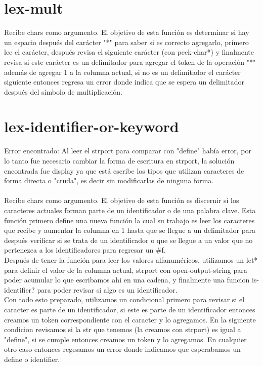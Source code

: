 \documentclass{article}
\begin{document}
\section{lex-mult}

Recibe chars como argumento. El objetivo de esta función es determinar si hay un espacio después del carácter "*" para saber si es correcto agregarlo, primero lee el carácter, después revisa el siguiente carácter (con peek-char*) y finalmente revisa si este carácter es un delimitador para agregar el token de la operación "*" además de agregar 1 a la columna actual, si no es un delimitador el carácter siguiente entonces regresa un error donde indica que se espera un delimitador después del símbolo de multiplicación.

\section{lex-identifier-or-keyword}

Error encontrado: Al leer el strport para comparar con "define" había error, por lo tanto fue necesario cambiar la forma de escritura en strport, la solución encontrada fue display ya que está escribe los tipos que utilizan caracteres de forma directa o "cruda", es decir sin modificarlas de ninguna forma.
\\
\\
Recibe chars como argumento. El objetivo de esta función es discernir si los caracteres actuales forman parte de un identificador o de una palabra clave. Esta función primero define una nueva función la cual su trabajo es leer los caracteres que recibe y aumentar la columna en 1 hasta que se llegue a un delimitador para después verificar si se trata de un identificador o que se llegue a un valor que no pertenezca a los identificadores para regresar un \#f.
\\
Después de tener la función para leer los valores alfanuméricos, utilizamos un let* para definir el valor de la columna actual, strport con open-output-string para poder acumular lo que escribamos ahi en una cadena, y finalmente una funcion is-identifier? para poder revisar si algo es un identificador.
\\
Con todo esto preparado, utilizamos un condicional primero para revisar si el caracter es parte de un identificador, si este es parte de un identificador entonces creamos un token correspondiente con el caracter y lo agregamos. En la siguiente condicion revisamos si la str que tenemos (la creamos con strport) es igual a "define", si se cumple entonces creamos un token y lo agregamos. En cualquier otro caso entonces regesamos un error donde indicamos que esperabamos un define o identifier.
\end{document}
